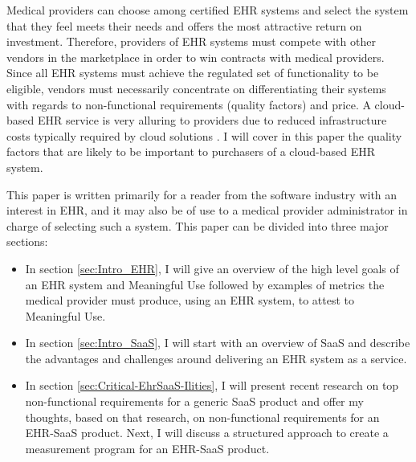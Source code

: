 \documentclass[10pt]{article}
\begin{document}
Medical providers can choose among certified EHR systems and select the system that they feel meets their needs and offers the most attractive return on investment.
Therefore, providers of EHR systems must compete with other vendors in the marketplace in order to win contracts with medical providers.
Since all EHR systems must achieve the regulated set of functionality to be eligible, vendors must necessarily concentrate on differentiating their systems with regards to non-functional requirements (quality factors) and price.
A cloud-based EHR service is very alluring to providers due to reduced infrastructure costs typically required by cloud solutions \cite{auditingprivacy}.
I will cover in this paper the quality factors that are likely to be important to purchasers of a cloud-based EHR system.

This paper is written primarily for a reader from the software industry with an interest in EHR, and it may also be of use to a medical provider administrator in charge of selecting such a system.
This paper can be divided into three major sections:
\begin{itemize}
	\item In section \ref{sec:Intro_EHR}, I will give an overview of the high level goals of an EHR system and Meaningful Use followed by examples of metrics the medical provider must produce, using an EHR system, to attest to Meaningful Use.
	\item In section \ref{sec:Intro_SaaS}, I will start with an overview of SaaS and describe the advantages and challenges around delivering an EHR system as a service.
	\item In section \ref{sec:Critical-EhrSaaS-Ilities}, I will present recent research on top non-functional requirements for a generic SaaS product and offer my thoughts, based on that research, on non-functional requirements for an EHR-SaaS product. Next, I will discuss a structured approach to create a measurement program for an EHR-SaaS product.
\end{itemize}


\end{document}

